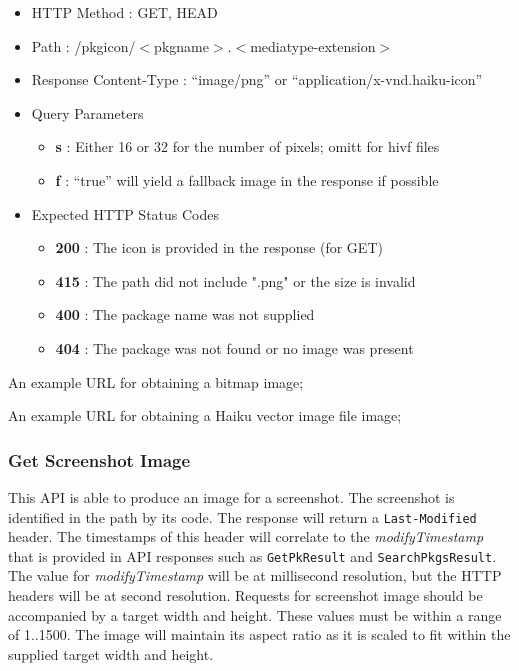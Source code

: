 \begin{itemize}
\item HTTP Method : GET, HEAD
\item Path : /pkgicon/$<$pkgname$>$.$<$mediatype-extension$>$
\item Response Content-Type : ``image/png'' or ``application/x-vnd.haiku-icon''
\item Query Parameters
  \begin{itemize}
  \item {\bf s} : Either 16 or 32 for the number of pixels; omitt for hivf files
  \item {\bf f} : ``true'' will yield a fallback image in the response if possible
  \end{itemize}
\item Expected HTTP Status Codes
  \begin{itemize}
  \item {\bf 200} : The icon is provided in the response (for GET)
  \item {\bf 415} : The path did not include ".png" or the size is invalid
  \item {\bf 400} : The package name was not supplied
  \item {\bf 404} : The package was not found or no image was present
  \end{itemize}
\end{itemize}

An example URL for obtaining a bitmap image;


An example URL for obtaining a Haiku vector image file image;



\subsubsection{Get Screenshot Image}

This API is able to produce an image for a screenshot.  The screenshot is identified in the path by its code.  The response will return a {\tt Last-Modified} header.  The timestamps of this header will correlate to the {\it modifyTimestamp} that is provided in API responses such as {\tt GetPkResult} and {\tt SearchPkgsResult}.  The value for {\it modifyTimestamp} will be at millisecond resolution, but the HTTP headers will be at second resolution.  Requests for screenshot image should be accompanied by a target width and height.  These values must be within a range of 1..1500.  The image will maintain its aspect ratio as it is scaled to fit within the supplied target width and height.


